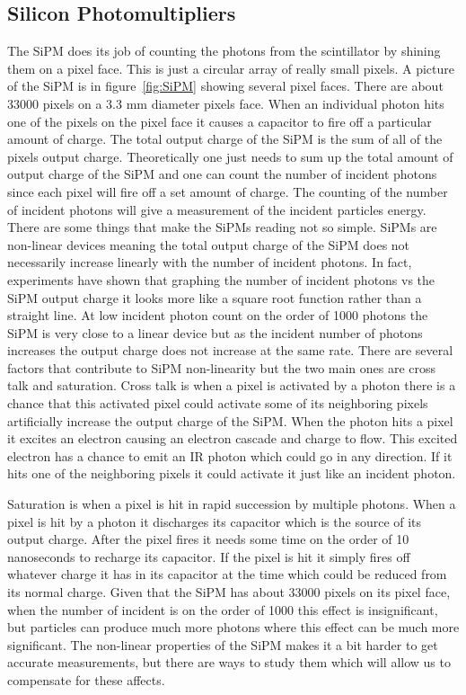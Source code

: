 \subsection{Silicon Photomultipliers}
The SiPM does its job of counting the photons from the scintillator by shining them on a pixel face. This is just a circular array of really small pixels. A picture of the SiPM is in figure~\ref{fig:SiPM} showing several pixel faces. There are about 33000 pixels on a 3.3 mm diameter pixels face. When an individual photon hits one of the pixels on the pixel face it causes a capacitor to fire off a particular amount of charge. The total output charge of the SiPM is the sum of all of the pixels output charge. Theoretically one just needs to sum up the total amount of output charge of the SiPM and one can count the number of incident photons since each pixel will fire off a set amount of charge. The counting of the number of incident photons will give a measurement of the incident particles energy. There are some things that make the SiPMs reading not so simple. SiPMs are non-linear devices meaning the total output charge of the SiPM does not necessarily increase linearly with the number of incident photons. In fact, experiments have shown that graphing the number of incident photons vs the SiPM output charge it looks more like a square root function rather than a straight line. At low incident photon count on the order of 1000 photons the SiPM is very close to a linear device but as the incident number of photons increases the output charge does not increase at the same rate. There are several factors that contribute to SiPM non-linearity but the two main ones are cross talk and saturation. Cross talk is when a pixel is activated by a photon there is a chance that this activated pixel could activate some of its neighboring pixels artificially increase the output charge of the SiPM. When the photon hits a pixel it excites an electron causing an electron cascade and charge to flow. This excited electron has a chance to emit an IR photon which could go in any direction. If it hits one of the neighboring pixels it could activate it just like an incident photon. 

Saturation is when a pixel is hit in rapid succession by multiple photons. When a pixel is hit by a photon it discharges its capacitor which is the source of its output charge. After the pixel fires it needs some time on the order of 10 nanoseconds to recharge its capacitor. If the pixel is hit it simply fires off whatever charge it has in its capacitor at the time which could be reduced from its normal charge. Given that the SiPM has about 33000 pixels on its pixel face, when the number of incident is on the order of 1000 this effect is insignificant, but particles can produce much more photons where this effect can be much more significant. The non-linear properties of the SiPM makes it a bit harder to get accurate measurements, but there are ways to study them which will allow us to compensate for these affects.

